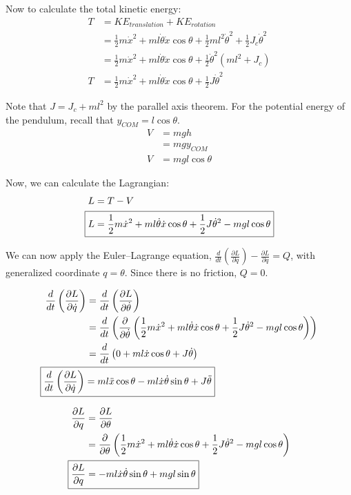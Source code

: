 \documentclass{article}
\begin{document}
Now to calculate the total kinetic energy:
\begin{align*}
    T &= KE_{translation} + KE_{rotation} \\
    &= \frac{1}{2}m\dot{x}^2 + ml\dot{\theta}\dot{x}\cos{\theta} + \frac{1}{2}ml^2\dot{\theta}^2 + \frac{1}{2}J_c\dot{\theta}^2 \\
    &= \frac{1}{2}m\dot{x}^2 + ml\dot{\theta}\dot{x}\cos{\theta} + \frac{1}{2}\dot{\theta}^2 \left(ml^2 + J_c\right) \\
    T &= \frac{1}{2}m\dot{x}^2 + ml\dot{\theta}\dot{x}\cos{\theta} + \frac{1}{2}J\dot{\theta}^2
\end{align*}

Note that $J = J_c + ml^2$ by the parallel axis theorem. For the potential energy of the pendulum, recall that $y_{COM} = l\cos{\theta}$.
\begin{align*}
    V &= mgh \\
    &= mgy_{COM} \\
    V &= mgl\cos{\theta}
\end{align*}

Now, we can calculate the Lagrangian:
\begin{align*}
    L &= T - V \\
    \Aboxed{L &= \frac{1}{2}m\dot{x}^2 + ml\dot{\theta}\dot{x}\cos{\theta} + \frac{1}{2}J\dot{\theta}^2 - mgl\cos{\theta}}
\end{align*}

We can now apply the Euler--Lagrange equation, $\frac{d}{dt}\left(\frac{\partial L}{\partial \dot{q}}\right) - \frac{\partial L}{\partial q} = Q$, with generalized coordinate $q = \theta$. Since there is no friction, $Q=0$.

\begin{align*}
    \frac{d}{dt}\left(\frac{\partial L}{\partial \dot{q}}\right) &= \frac{d}{dt}\left(\frac{\partial L}{\partial \dot{\theta}}\right) \\
    &= \frac{d}{dt}\left(\frac{\partial}{\partial \dot{\theta}} \left(\frac{1}{2}m\dot{x}^2 + ml\dot{\theta}\dot{x}\cos{\theta} + \frac{1}{2}J\dot{\theta}^2 - mgl\cos{\theta}\right) \right) \\
    &= \frac{d}{dt}\left(0 + ml\dot{x}\cos{\theta} + J\dot{\theta}\right) \\
    \Aboxed{\frac{d}{dt}\left(\frac{\partial L}{\partial \dot{q}}\right) & = ml\ddot{x}\cos{\theta} - ml\dot{x}\dot{\theta}\sin{\theta} + J\ddot{\theta}}
\end{align*}

\begin{align*}
    \frac{\partial L}{\partial q} &= \frac{\partial L}{\partial \theta} \\
    &= \frac{\partial}{\partial \theta}\left(\frac{1}{2}m\dot{x}^2 + ml\dot{\theta}\dot{x}\cos{\theta} + \frac{1}{2}J\dot{\theta}^2 - mgl\cos{\theta}\right) \\
    \Aboxed{\frac{\partial L}{\partial q} &= -ml\dot{x}\dot{\theta}\sin{\theta} + mgl\sin{\theta}}
\end{align*}
\end{document}
